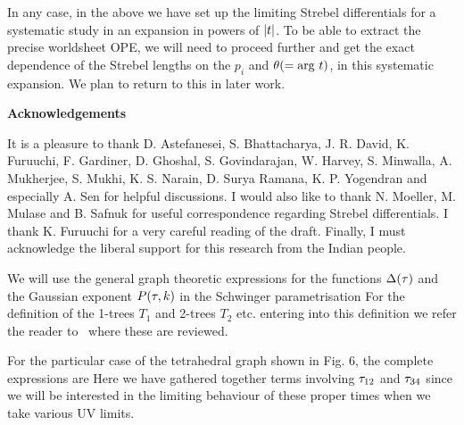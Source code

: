 In any case, in the above we have set up the limiting Strebel differentials 
for a systematic study in an expansion in powers of $|t|$. 
To be able to extract the precise worldsheet OPE, we will need to 
proceed further and get the exact dependence of the Strebel lengths 
on the $p_i$ and $\theta (={\rm arg} \ t)$, in this systematic expansion. 
We plan to return to this in later work.

\medskip
\centerline{\bf Acknowledgements}

It is a pleasure to thank D. Astefanesei,
S. Bhattacharya, J. R. David, K. Furuuchi, F. Gardiner, D. Ghoshal, 
S. Govindarajan, W. Harvey, 
S. Minwalla, A. Mukherjee, S. Mukhi, K. S. Narain, D. Surya Ramana,
K. P. Yogendran  and especially 
A. Sen for helpful discussions. I would also like to thank N. Moeller, 
M. Mulase and B. Safnuk for useful correspondence regarding Strebel 
differentials. I thank K. Furuuchi for a very careful reading of the draft. 
Finally, I must acknowledge the liberal support for this research 
from the Indian people.





We will use the general graph theoretic expressions for the functions 
${\Delta} ({\tau})$ and the Gaussian exponent $P({\tau}, k)$ in the 
Schwinger parametrisation
\eqn{} 
\eqn{}
For the definition of the 1-trees $T_1$ and 2-trees $T_2$ etc. entering into
this definition we refer the reader to \ffb\ where these are reviewed. 

For the particular case of the tetrahedral graph shown in Fig. 6, 
the complete expressions are  
\eqn{}
\eqn{}
Here we have gathered together terms involving ${\tau}_{12}$ and ${\tau}_{34}$
since we will be interested in the limiting behaviour of these proper times
when we take various UV limits.

